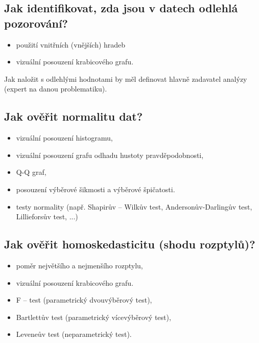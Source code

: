 \subsection*{Jak identifikovat, zda jsou v datech odlehlá pozorování?}
\label{subsec:how-to-identify-outliers}

\noindent
{}
\begin{itemize}
    \item použití vnitřních (vnějších) hradeb
    \item vizuální posouzení krabicového grafu.
\end{itemize}

\noindent 
Jak naložit s odlehlými hodnotami by měl definovat hlavně zadavatel analýzy (expert na danou problematiku).

\subsection*{Jak ověřit normalitu dat?}
\label{subsec:how-to-verify-normality}

\noindent
{}
\begin{itemize}
    \item vizuální posouzení histogramu,
    \item vizuální posouzení grafu odhadu hustoty pravděpodobnosti,
    \item Q-Q graf,
    \item posouzení výběrové šikmosti a výběrové špičatosti.
\end{itemize}

\noindent
{}
\begin{itemize}
    \item testy normality (např. Shapirův – Wilkův test, Andersonův-Darlingův test, Lillieforsův test, ...)
\end{itemize}

\subsection*{Jak ověřit homoskedasticitu (shodu rozptylů)?}
\label{subsec:how-to-verify-homoscedasticity}

\noindent
{}
\begin{itemize}
    \item poměr největšího a nejmenšího rozptylu,
    \item vizuální posouzení krabicového grafu.
\end{itemize}

\noindent
{}
\begin{itemize}
    \item F – test (parametrický dvouvýběrový test),
    \item Bartlettův test (parametrický vícevýběrový test),
    \item Leveneův test (neparametrický test).
\end{itemize}

\endinput